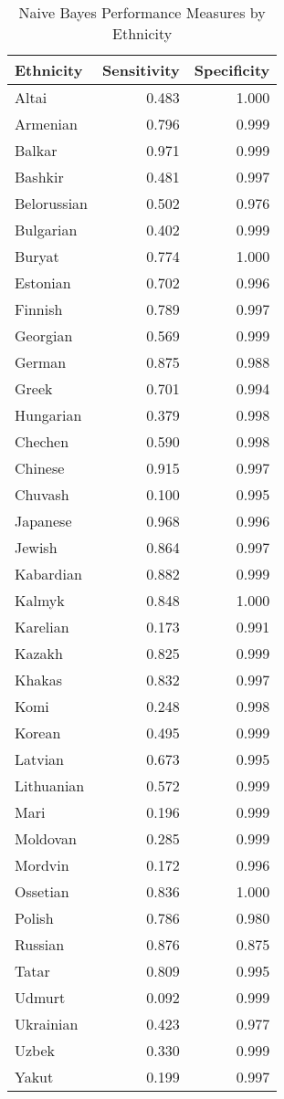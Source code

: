 \begin{table}[t]

\caption{\label{tab:sens_spec}Naive Bayes Performance Measures by Ethnicity}
\centering
\fontsize{9}{11}\selectfont
\begin{tabular}{lrr}
\toprule
Ethnicity & Sensitivity & Specificity\\
\midrule
Altai & 0.483 & 1.000\\
Armenian & 0.796 & 0.999\\
Balkar & 0.971 & 0.999\\
Bashkir & 0.481 & 0.997\\
Belorussian & 0.502 & 0.976\\
Bulgarian & 0.402 & 0.999\\
Buryat & 0.774 & 1.000\\
Estonian & 0.702 & 0.996\\
Finnish & 0.789 & 0.997\\
Georgian & 0.569 & 0.999\\
German & 0.875 & 0.988\\
Greek & 0.701 & 0.994\\
Hungarian & 0.379 & 0.998\\
Chechen & 0.590 & 0.998\\
Chinese & 0.915 & 0.997\\
Chuvash & 0.100 & 0.995\\
Japanese & 0.968 & 0.996\\
Jewish & 0.864 & 0.997\\
Kabardian & 0.882 & 0.999\\
Kalmyk & 0.848 & 1.000\\
Karelian & 0.173 & 0.991\\
Kazakh & 0.825 & 0.999\\
Khakas & 0.832 & 0.997\\
Komi & 0.248 & 0.998\\
Korean & 0.495 & 0.999\\
Latvian & 0.673 & 0.995\\
Lithuanian & 0.572 & 0.999\\
Mari & 0.196 & 0.999\\
Moldovan & 0.285 & 0.999\\
Mordvin & 0.172 & 0.996\\
Ossetian & 0.836 & 1.000\\
Polish & 0.786 & 0.980\\
Russian & 0.876 & 0.875\\
Tatar & 0.809 & 0.995\\
Udmurt & 0.092 & 0.999\\
Ukrainian & 0.423 & 0.977\\
Uzbek & 0.330 & 0.999\\
Yakut & 0.199 & 0.997\\
\bottomrule
\end{tabular}
\end{table}